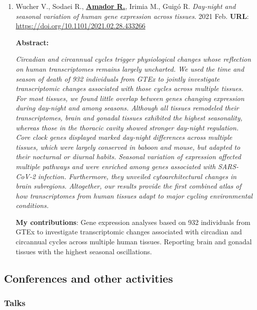 \begin{enumerate}
\item Wucher V., Sodaei R., \textbf{\underline{Amador R.}}, Irimia M., Guigó R. \textit{Day-night and seasonal variation of human gene expression across tissues}. 2021 Feb. \newline\newline
\textbf{URL}: \url{https://doi.org/10.1101/2021.02.28.433266}
\begin{center}
\textbf{Abstract:}
\end{center}
\textit{Circadian and circannual cycles trigger physiological changes whose reflection on human transcriptomes remains largely uncharted. We used the time and season of death of 932 individuals from GTEx to jointly investigate transcriptomic changes associated with those cycles across multiple tissues. For most tissues, we found little overlap between genes changing expression during day-night and among seasons. Although all tissues remodeled their transcriptomes, brain and gonadal tissues exhibited the highest seasonality, whereas those in the thoracic cavity showed stronger day-night regulation. Core clock genes displayed marked day-night differences across multiple tissues, which were largely conserved in baboon and mouse, but adapted to their nocturnal or diurnal habits. Seasonal variation of expression affected multiple pathways and were enriched among genes associated with SARS-CoV-2 infection. Furthermore, they unveiled cytoarchitectural changes in brain subregions. Altogether, our results provide the first combined atlas of how transcriptomes from human tissues adapt to major cycling environmental conditions.
}

\textbf{My contributions}: Gene expression analyses based on 932 individuals from GTEx to investigate transcriptomic changes associated with circadian and circannual cycles across multiple human tissues. Reporting brain and gonadal tissues with the highest seasonal oscillations. 

\end{enumerate}  

\subsection{Conferences and other activities}
\label{sec:conferences_and_other_activities}

\subsubsection{Talks}
\label{sec:talks}

